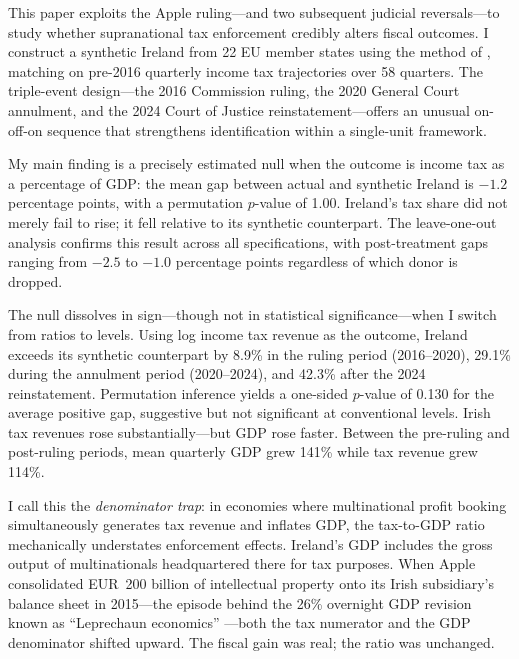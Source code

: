 \documentclass[12pt]{article}
\begin{document}
This paper exploits the Apple ruling---and two subsequent judicial reversals---to study whether supranational tax enforcement credibly alters fiscal outcomes. I construct a synthetic Ireland from 22 EU member states using the method of \citet{abadie2010synthetic}, matching on pre-2016 quarterly income tax trajectories over 58 quarters. The triple-event design---the 2016 Commission ruling, the 2020 General Court annulment, and the 2024 Court of Justice reinstatement---offers an unusual on-off-on sequence that strengthens identification within a single-unit framework.

My main finding is a precisely estimated null when the outcome is income tax as a percentage of GDP: the mean gap between actual and synthetic Ireland is $-1.2$ percentage points, with a permutation $p$-value of 1.00. Ireland's tax share did not merely fail to rise; it fell relative to its synthetic counterpart. The leave-one-out analysis confirms this result across all specifications, with post-treatment gaps ranging from $-2.5$ to $-1.0$ percentage points regardless of which donor is dropped.

The null dissolves in sign---though not in statistical significance---when I switch from ratios to levels. Using log income tax revenue as the outcome, Ireland exceeds its synthetic counterpart by 8.9\% in the ruling period (2016--2020), 29.1\% during the annulment period (2020--2024), and 42.3\% after the 2024 reinstatement. Permutation inference yields a one-sided $p$-value of 0.130 for the average positive gap, suggestive but not significant at conventional levels. Irish tax revenues rose substantially---but GDP rose faster. Between the pre-ruling and post-ruling periods, mean quarterly GDP grew 141\% while tax revenue grew 114\%.

I call this the \textit{denominator trap}: in economies where multinational profit booking simultaneously generates tax revenue and inflates GDP, the tax-to-GDP ratio mechanically understates enforcement effects. Ireland's GDP includes the gross output of multinationals headquartered there for tax purposes. When Apple consolidated EUR~200 billion of intellectual property onto its Irish subsidiary's balance sheet in 2015---the episode behind the 26\% overnight GDP revision known as ``Leprechaun economics'' \citep{kind2018measuring, lane2017treatment}---both the tax numerator and the GDP denominator shifted upward. The fiscal gain was real; the ratio was unchanged.
\end{document}
